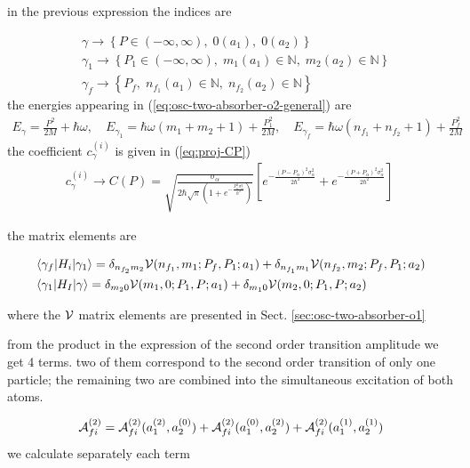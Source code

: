 in the previous expression the indices are
\begin{importantbox}
  \begin{align}
    & \gamma\rightarrow\left\{P\in({-\infty},\infty), \;0(a_1), \;0(a_2)\right\}                              \nonumber          \\
    & \gamma_1\rightarrow\left\{P_1\in({-\infty},\infty), \;m_1(a_1)\in{\mathbb{N}}, \;m_2(a_2)\in{\mathbb{N}}\right\} \nonumber \\
    & \gamma_f\rightarrow\left\{P_f,\; n_{f_1}(a_1)\in{\mathbb{N}}, \;n_{f_2}(a_2)\in{\mathbb{N}}\right\}
  \end{align}
  the energies appearing in (\ref{eq:osc-two-absorber-o2-general}) are
  \begin{align}
    E_{\gamma} = \frac{P^2}{2M}+\hbar\omega,\quad E_{\gamma_1} = \hbar\omega(m_1 + m_2 +1)+\frac{P_1^2}{2M},\quad E_{\gamma_f} = \hbar\omega(n_{f_1}+n_{f_2}+1)+\frac{P_f^2}{2M}
  \end{align}
  the coefficient $c_{\gamma}^{(i)}$ is given in (\ref{eq:proj-CP})
  \begin{align}
    c_\gamma^{(i)}\rightarrow C(P) = \sqrt{\frac{\sigma_\alpha}{2\hbar\sqrt{\pi}\left(1+e^{-\frac{P_\alpha^2\sigma_\alpha^2}{\hbar^2}}\right)}}\left[ e^{-\frac{(P-P_\alpha)^2\sigma_\alpha^2}{2\hbar^2}} + e^{-\frac{(P+P_\alpha)^2\sigma_\alpha^2}{2\hbar^2}} \right]\
  \end{align}
\end{importantbox}

the matrix elements are
\begin{importantbox}
  \begin{align}
    &\langle\gamma_f|H_i|\gamma_1\rangle = \delta_{n_{f_2}m_2}{\cal V}(n_{f_1},m_1;P_{f},P_1;a_1)+\delta_{n_{f_1}m_1}{\cal V}(n_{f_2},m_2;P_f,P_1;a_2)\\
    &\langle \gamma_1|H_I|\gamma \rangle   =\delta_{m_20}{\cal V}(m_1,0;P_1,P;a_1)+\delta_{m_10}{\cal V}(m_2,0;P_1,P;a_2)
  \end{align}
\end{importantbox}
where the ${\cal V}$ matrix elements are presented in  Sect. \ref{sec:osc-two-absorber-o1}

from the product in the expression  of the second order transition amplitude we get 4 terms. two of them correspond to the second order transition of only one particle; the remaining two are combined into the simultaneous excitation of both atoms.

\begin{align}
  {\cal A}_{fi}^{(2)} = {\cal A}_{fi}^{(2)}(a_1^{(2)}, a_2^{(0)})+{\cal A}_{fi}^{(2)}(a_1^{(0)}, a_2^{(2)})+{\cal A}_{fi}^{(2)}(a_1^{(1)}, a_2^{(1)})
\end{align}
we calculate separately each term

